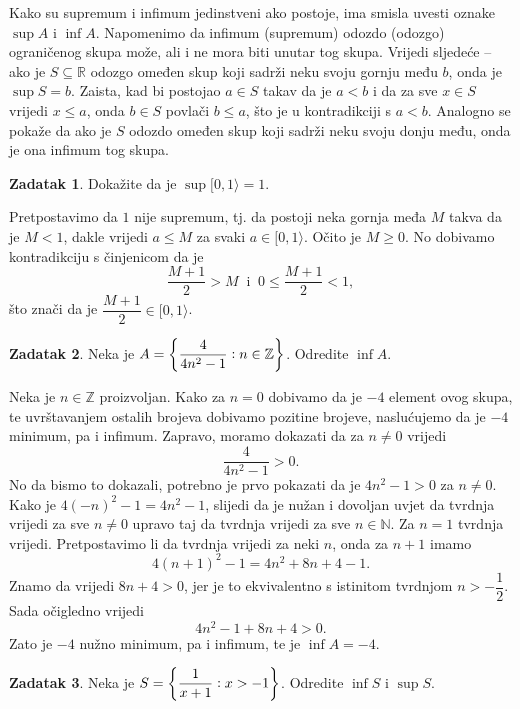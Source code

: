 \documentclass{book}
\let\originalleft\left
\let\originalright\right
\renewcommand{\left}{\mathopen{}\mathclose\bgroup\originalleft}
\renewcommand{\right}{\aftergroup\egroup\originalright}
\renewenvironment{proof}{%
    \vspace{-\parskip}\begin{oldproof}%
    }{%
    \end{oldproof}%
}
\theoremstyle{definition}
\theoremstyle{definition}
\newtheorem{exercise}{Zadatak}
\theoremstyle{remark}
\begin{document}
Kako su supremum i infimum jedinstveni ako postoje, ima smisla uvesti oznake $\sup{A}$ i $\inf{A}$.
Napomenimo da infimum (supremum) odozdo (odozgo) ograničenog skupa može, ali i ne mora biti unutar tog skupa. Vrijedi sljedeće -- ako je $S\subseteq \mathbb{R}$ odozgo omeđen skup koji sadrži neku svoju gornju među $b$, onda je $\sup{S}=b$. Zaista, kad bi postojao $a\in S$ takav da je $a<b$ i da za sve $x\in S$ vrijedi $x\leq a$, onda $b\in S$ povlači $b\leq a$, što je u kontradikciji s $a<b$. Analogno se pokaže da ako je $S$ odozdo omeđen skup koji sadrži neku svoju donju među, onda je ona infimum tog skupa.
\begin{exercise}
Dokažite da je $\sup{[0, 1\rangle}=1$.
\end{exercise}
\begin{proof}[Rješenje]
Pretpostavimo da $1$ nije supremum, tj. da postoji neka gornja međa $M$ takva da je $M<1$, dakle vrijedi $a\leq M$ za svaki $a\in [0, 1\rangle$. Očito je $M\geq 0$. No dobivamo kontradikciju s činjenicom da je $$\dfrac{M+1}{2}>M\;\;\text{i}\;\;0\leq \dfrac{M+1}{2}<1,$$ što znači da je $\dfrac{M+1}{2}\in [0, 1\rangle$.
\end{proof}
\begin{exercise}
Neka je $A=\left\{\dfrac{4}{4n^2-1} : n\in \mathbb{Z}\right\}$. Odredite $\inf{A}$.
\end{exercise}
\begin{proof}[Rješenje]
Neka je $n\in \mathbb{Z}$ proizvoljan. Kako za $n=0$ dobivamo da je $-4$ element ovog skupa, te uvrštavanjem ostalih brojeva dobivamo pozitine brojeve, naslućujemo da je $-4$ minimum, pa i infimum. Zapravo, moramo dokazati da za $n\neq 0$ vrijedi $$\dfrac{4}{4n^2-1}>0.$$ No da bismo to dokazali, potrebno je prvo pokazati da je $4n^2-1>0$ za $n\neq 0$. Kako je $4(-n)^2-1=4n^2-1$, slijedi da je nužan i dovoljan uvjet da tvrdnja vrijedi za sve $n\neq 0$ upravo taj da tvrdnja vrijedi za sve $n\in \mathbb{N}$. Za $n=1$ tvrdnja vrijedi. Pretpostavimo li da tvrdnja vrijedi za neki $n$, onda za $n+1$ imamo $$4(n+1)^2-1=4n^2+8n+4-1.$$ Znamo da vrijedi $8n+4>0$, jer je to ekvivalentno s istinitom tvrdnjom $n>-\dfrac{1}{2}$. Sada očigledno vrijedi $$4n^2-1+8n+4>0.$$ Zato je $-4$ nužno minimum, pa i infimum, te je $\inf{A}=-4$.
\end{proof}
\begin{exercise}
\label{13}
Neka je $S=\left\{\dfrac{1}{x+1} : x>-1\right\}$. Odredite $\inf{S}$ i $\sup{S}$.
\end{exercise}
\end{document}
